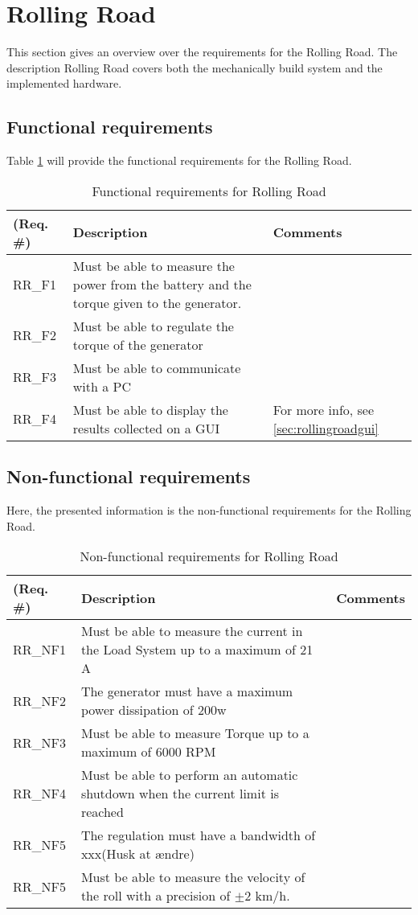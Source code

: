 \section{Rolling Road}
This section gives an overview over the requirements for the Rolling Road. The description Rolling Road covers both the mechanically build system and the implemented hardware. 

\subsection{Functional requirements}
Table \ref{Functional:Rolling Road} will provide the functional requirements for the Rolling Road.

\begin{table}[h!]
	\centering
	\begin{tabular}{|p{2 cm}|p{7 cm}|p{4 cm}|}
	\hline
	\textbf{(Req. \#)} & \textbf{Description} & \textbf{Comments} \\\hline
	RR\_F1	& Must be able to measure the power from the battery and the torque given to the generator. &   \\\hline
	RR\_F2	& Must be able to regulate the torque of the generator &   \\\hline
	RR\_F3	& Must be able to communicate with a PC &   \\\hline
	RR\_F4	& Must be able to display the results collected on a GUI & For more info, see \ref{sec:rollingroadgui}  \\\hline
	\end{tabular}
	\label{Functional:Rolling Road}
	\caption{Functional requirements for Rolling Road}
\end{table}

\subsection{Non-functional requirements}
Here, the presented information is the non-functional requirements for the Rolling Road.

\begin{table}[h!]
	\centering
	\begin{tabular}{|p{2 cm}|p{7 cm}|p{4 cm}|}
		\hline
		\textbf{(Req. \#)} & \textbf{Description} & \textbf{Comments} \\\hline
		RR\_NF1	& Must be able to measure the current in the Load System up to a maximum of 21 A  &   \\\hline
		RR\_NF2	& The generator must have a maximum power dissipation of 200w &   \\\hline
		RR\_NF3	& Must be able to measure Torque up to a maximum of 6000 RPM &   \\\hline
		RR\_NF4	& Must be able to perform an automatic shutdown when the current limit is reached &   \\\hline
		RR\_NF5	& The regulation must have a bandwidth of xxx\fxnote(Husk at ændre) &   \\\hline
		RR\_NF5	& Must be able to measure the velocity of the roll with a precision of $\pm$2 km/h. &   \\\hline
	\end{tabular}
	\label{Nonfunctional:RollingRoad}
	\caption{Non-functional requirements for Rolling Road}
\end{table}